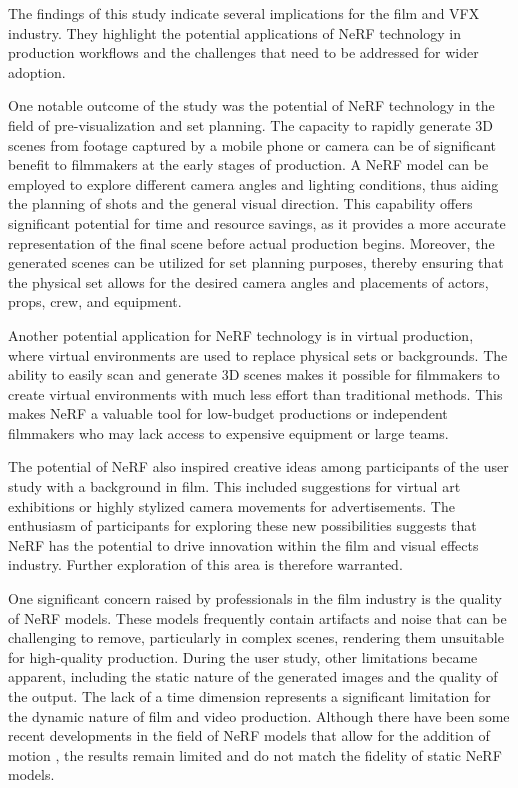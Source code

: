 The findings of this study indicate several implications for the film and VFX industry. 
They highlight the potential applications of NeRF technology in production workflows and the challenges that need to be addressed for wider adoption.

One notable outcome of the study was the potential of NeRF technology in the field of pre-visualization and set planning.
The capacity to rapidly generate 3D scenes from footage captured by a mobile phone or camera can be of significant benefit to filmmakers at the early stages of production.
A NeRF model can be employed to explore different camera angles and lighting conditions, thus aiding the planning of shots and the general visual direction.
This capability offers significant potential for time and resource savings, as it provides a more accurate representation of the final scene before actual production begins.
Moreover, the generated scenes can be utilized for set planning purposes, thereby ensuring that the physical set allows for the desired camera angles and placements of actors, props, crew, and equipment.

Another potential application for NeRF technology is in virtual production, where virtual environments are used to replace physical sets or backgrounds.
The ability to easily scan and generate 3D scenes makes it possible for filmmakers to create virtual environments with much less effort than traditional methods.
This makes NeRF a valuable tool for low-budget productions or independent filmmakers who may lack access to expensive equipment or large teams.

The potential of NeRF also inspired creative ideas among participants of the user study with a background in film.
This included suggestions for virtual art exhibitions or highly stylized camera movements for advertisements.
The enthusiasm of participants for exploring these new possibilities suggests that NeRF has the potential to drive innovation within the film and visual effects industry. Further exploration of this area is therefore warranted.   

One significant concern raised by professionals in the film industry is the quality of NeRF models.
These models frequently contain artifacts and noise that can be challenging to remove, particularly in complex scenes, rendering them unsuitable for high-quality production.
During the user study, other limitations became apparent, including the static nature of the generated images and the quality of the output.
The lack of a time dimension represents a significant limitation for the dynamic nature of film and video production.
Although there have been some recent developments in the field of NeRF models that allow for the addition of motion  \cite{fridovich-keil_k-planes_2023}, the results remain limited and do not match the fidelity of static NeRF models.


